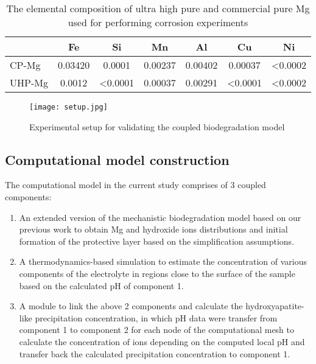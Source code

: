 \begin{table}[t]
\caption[The elemental composition of highly-pure and commercial-pure Mg]{The elemental composition of ultra high pure and commercial pure Mg used for performing corrosion experiments}
\medskip
\centering
\begin{tabular}{lcccccc}
\hline & {Fe} & {Si} & {Mn} & {Al} & {Cu} & {Ni} \\
\hline { CP-Mg } & 0.03420 & 0.0001 & 0.00237 & 0.00402 & 0.00037 & <0.0002  \\
{ UHP-Mg } & 0.0012 & <0.0001 & 0.00037 & 0.00291 & <0.0001 & <0.0002
\end{tabular}
\label{tab:kinetics_alloys_composition}
\end{table}


\begin{figure}[h]
\centering
\medskip
\texttt{[image: setup.jpg]}
\caption[Experimental setup for validating the coupled biodegradation model]{Experimental setup for validating the coupled biodegradation model} \label{fig:kinetics_setup}
\end{figure}

\subsection{Computational model construction}

The computational model in the current study comprises of 3 coupled components:
\begin{enumerate}
\item
An extended version of the mechanistic biodegradation model based on our previous work \cite{Barzegari2021} to obtain Mg and hydroxide ions distributions and initial formation of the protective layer based on the simplification assumptions.
\item
A thermodynamics-based simulation to estimate the concentration of various components of the electrolyte in regions close to the surface of the sample based on the calculated pH of component 1.
\item
A module to link the above 2 components and calculate the hydroxyapatite-like precipitation concentration, in which pH data were transfer from component 1 to component 2 for each node of the computational mesh to calculate the concentration of ions depending on the computed local pH and transfer back the calculated precipitation concentration to component 1.
\end{enumerate}

